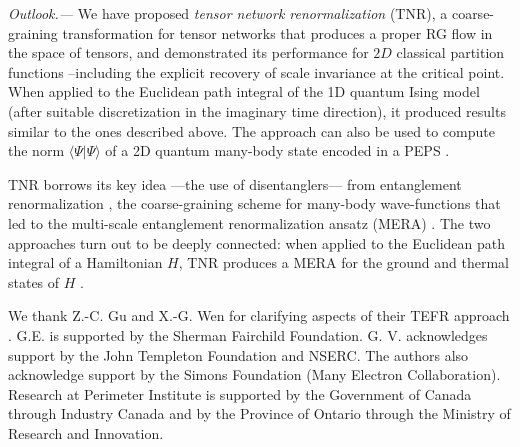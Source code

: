 \documentclass[aps,prl,twocolumn,showpacs,superscriptaddress,floatfix,10pt]{revtex4-1}
\newcommand{\bk}[1]{\mbox{$\langle #1 \rangle$}}
\begin{document}
\textit{Outlook.---} We have proposed \textit{tensor network renormalization} (TNR), a coarse-graining transformation for tensor networks that produces a proper RG flow in the space of tensors, and demonstrated its performance for $2D$ classical partition functions --including the explicit recovery of scale invariance at the critical point. When applied to the Euclidean path integral of the 1D quantum Ising model (after suitable discretization in the imaginary time direction), it produced results similar to the ones described above. The approach can also be used to compute the norm $\bk{\Psi | \Psi}$ of a 2D quantum many-body state encoded in a PEPS \cite{PEPS}.

TNR borrows its key idea ---the use of disentanglers--- from entanglement renormalization \cite{ER,Algorithms}, the coarse-graining scheme for many-body wave-functions that led to the multi-scale entanglement renormalization ansatz (MERA) \cite{MERA,MERACFT}. The two approaches turn out to be deeply connected: when applied to the Euclidean path integral of a Hamiltonian $H$, TNR produces a MERA for the ground and thermal states of $H$ \cite{TNRtoMERA}. 
     
We thank Z.-C. Gu and X.-G. Wen for clarifying aspects of their TEFR approach \cite{TEFR}. G.E. is supported by the Sherman Fairchild Foundation. G. V. acknowledges support by the John Templeton Foundation and NSERC. The authors also acknowledge support by the Simons Foundation (Many Electron Collaboration). Research at Perimeter Institute is supported by the Government of Canada through Industry Canada and by the Province of Ontario through the Ministry of Research and Innovation.
\end{document}
